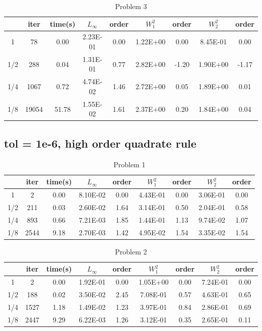 \documentclass{article}
\begin{document}
\begin{table}[H]
	\centering
	\caption{Problem 3}
	\begin{tabular}{|c|c|c|c|c|c|c|c|c|}
		\hline
		& iter  & time(s) & $L_{\infty}$ & order & $W_1^2$  & order & $W_2^2$  & order \\ \hline
		1   & 78    & 0.00    & 2.23E-01     & 0.00  & 1.22E+00 & 0.00  & 8.45E-01 & 0.00  \\ \hline
		1/2 & 288   & 0.04    & 1.31E-01     & 0.77  & 2.82E+00 & -1.20 & 1.90E+00 & -1.17 \\ \hline
		1/4 & 1067  & 0.72    & 4.74E-02     & 1.46  & 2.72E+00 & 0.05  & 1.89E+00 & 0.01  \\ \hline
		1/8 & 19054 & 51.78   & 1.55E-02     & 1.61  & 2.37E+00 & 0.20  & 1.84E+00 & 0.04  \\ \hline
	\end{tabular}
\end{table}
\subsection{tol = 1e-6, high order quadrate rule}
\begin{table}[H]
	\centering
	\caption{Problem 1}
	\begin{tabular}{|c|c|c|c|c|c|c|c|c|}
		\hline
		& iter & time(s) & $L_{\infty}$ & order & $W_1^2$  & order & $W_2^2$  & order \\ \hline
		1   & 2    & 0.00    & 8.10E-02     & 0.00  & 4.43E-01 & 0.00  & 3.06E-01 & 0.00  \\ \hline
		1/2 & 211  & 0.03    & 2.60E-02     & 1.64  & 3.14E-01 & 0.50  & 2.04E-01 & 0.58  \\ \hline
		1/4 & 893  & 0.66    & 7.21E-03     & 1.85  & 1.44E-01 & 1.13  & 9.74E-02 & 1.07  \\ \hline
		1/8 & 2544 & 9.18    & 2.70E-03     & 1.42  & 4.95E-02 & 1.54  & 3.35E-02 & 1.54  \\ \hline
	\end{tabular}
\end{table}

\begin{table}[H]
	\centering
	\caption{Problem 2}
	\begin{tabular}{|c|c|c|c|c|c|c|c|c|}
		\hline
		& iter & time(s) & $L_{\infty}$ & order & $W_1^2$  & order & $W_2^2$  & order \\ \hline
		1   & 2    & 0.00    & 1.92E-01     & 0.00  & 1.05E+00 & 0.00  & 7.24E-01 & 0.00  \\ \hline
		1/2 & 188  & 0.02    & 3.50E-02     & 2.45  & 7.08E-01 & 0.57  & 4.63E-01 & 0.65  \\ \hline
		1/4 & 1527 & 1.18    & 1.49E-02     & 1.23  & 3.97E-01 & 0.84  & 2.86E-01 & 0.69  \\ \hline
		1/8 & 2447 & 9.29    & 6.22E-03     & 1.26  & 3.12E-01 & 0.35  & 2.65E-01 & 0.11  \\ \hline
	\end{tabular}
\end{table}
\end{document}
